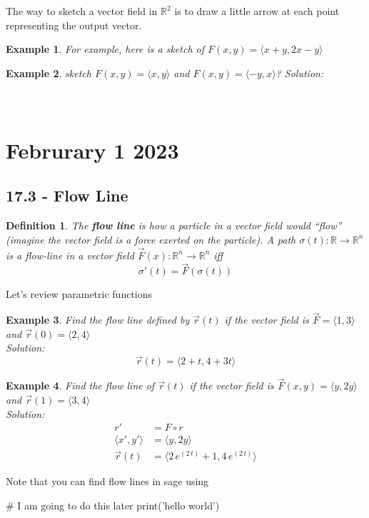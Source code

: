 \documentclass[11pt]{article}
\newtheorem{defn}{Definition}
\newtheorem{ex}{Example}
\begin{document}
The way to sketch a vector field in $\mathbb{R}^{2}$ is to draw a little arrow at each point representing the output vector.
\begin{ex}
  For example, here is a sketch of
$F(x,y) = \langle x + y, 2x - y \rangle$\\
\end{ex}

\begin{ex}
  sketch $F(x,y) = \langle x, y \rangle$ and $F(x,y)  = \langle -y, x \rangle$?
  Solution:\\
\\
\\
\end{ex}
\section{Februrary 1 2023}
\subsection{17.3 - Flow Line}
\begin{defn}
  The \textbf{flow line} is
  how a particle in a vector field would ``flow'' (imagine the vector field is a force exerted on the particle).
  A path $\sigma(t) : \mathbb{R} \to \mathbb{R}^{n}$ is a flow-line in a vector field $\vec{F}(x) : \mathbb{R}^{n} \to \mathbb{R}^{n} $ iff
  \[\sigma'(t) = \vec{F}(\sigma(t))\]
\end{defn}

Let's review parametric functions
\begin{ex}
  Find the flow line defined by $\vec{r}(t)$
  if the vector field is $\vec{F} = \langle 1,3 \rangle$ and  $\vec{r}(0) = \langle 2, 4 \rangle$\\
  Solution:
  \[\vec{r}(t) = \langle 2 + t, 4 + 3t \rangle \]
\end{ex}
\begin{ex}
  Find the flow line of $\vec{r}(t)$ if
  the vector field is $\vec{F}(x,y) = \langle y, 2y \rangle$
  and $\vec{r}(1) = \langle 3,4 \rangle$\\
  Solution:
  \begin{align*}
    r' &= F \circ r \\
    \langle x', y' \rangle &= \langle y, 2y \rangle \\
\vec{r}(t) &= \langle 2 \, e^{\left(2 \, t\right)} + 1, 4 \, e^{\left(2 \, t\right)}
\rangle
  \end{align*}
\end{ex}
Note that you can find flow lines in sage using
\begin{sageblock}
# I am going to do this later
print('hello world')
\end{sageblock}
\end{document}
